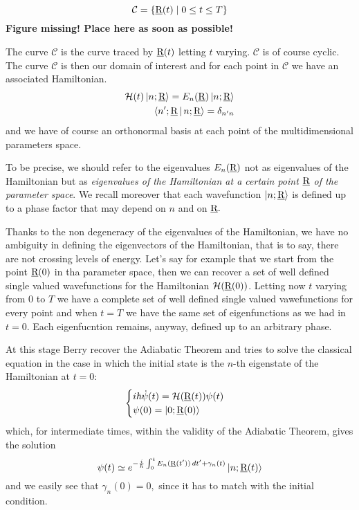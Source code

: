 \begin{equation}
\mathcal{C}=\left\{\underline{\textrm{R}}(t)\mid 0\leq t\leq T \right\}
\label{eq:Curve_C}
\end{equation}
\textbf{Figure missing! Place here as soon as possible!}

The curve $ \mathcal{C} $ is the curve traced by $ \underline{\textrm{R}}(t) $ letting $ t $ varying. $ \mathcal{C} $ is of course cyclic.
The curve $ \mathcal{C} $ is then our domain of interest and for each point in $ \mathcal{C} $ we have an associated Hamiltonian.
\begin{align}
\mathcal{H}(t)\Ket{n;\underline{\textrm{R}}}=E_n(\underline{\textrm{R}})\Ket{n;\underline{\textrm{R}}}\\
\Braket{n';\underline{\textrm{R}}|n;\underline{\textrm{R}}}=\delta_{n'n}
\end{align}
and we have of course an orthonormal basis at each point of the multidimensional parameters space.
\begin{rem}
	To be precise, we should refer to the eigenvalues $ E_{n}(\underline{\textrm{R}}) $ not as eigenvalues of the Hamiltonian but as \emph{eigenvalues of the Hamiltonian at a certain point $ \underline{\textrm{R}} $ of the parameter space}. We recall moreover that each wavefunction $ \Ket{n;\underline{\textrm{R}}} $ is defined up to a phase factor that may depend on $ n $ and on $ \underline{\textrm{R}}. $ 
\end{rem}
\begin{rem}
	Thanks to the non degeneracy of the eigenvalues of the Hamiltonian, we have no ambiguity in defining the eigenvectors of the Hamiltonian, that is to say, there are not crossing levels of energy. Let's say for example that we start from the point $ \underline{\textrm{R}}(0) $ in tha parameter space, then we can recover a set of well defined single valued wavefunctions for the Hamiltonian $ \mathcal{H}(\underline{\textrm{R}}(0)) $. Letting now $ t $ varying from $ 0 $ to $ T $ we have a complete set of well defined single valued vawefunctions for every point and when $ t=T $ we have the same set of eigenfunctions as we had in $ t=0. $ Each eigenfucntion remains, anyway, defined up to an arbitrary phase. 
\end{rem}

At this stage Berry recover the Adiabatic Theorem and tries to solve the classical \Sch equation in the case in which the initial state is the $ n $-th eigenstate of the Hamiltonian at $ t=0 $:
\begin{equation}
\begin{cases}
i\hbar\dot{\psi}(t)=\mathcal{H}(\underline{\textrm{R}}(t))\psi(t)\\
\psi(0)=\Ket{0;\underline{\textrm{R}}(0)}
\end{cases}
\end{equation}
which, for intermediate times, within the validity of the Adiabatic Theorem, gives the solution
\begin{equation}
\psi(t)\simeq e^{-\frac{i}{\hbar}\int_{0}^{t}E_n(\underline{\textrm{R}}(t'))\mathop{}\!d t'+\gamma_n(t)}\Ket{n;\underline{\textrm{R}}(t)}
\label{eq:gen_solution}
\end{equation}
and we easily see that $ \gamma_n(0)=0, $ since it has to match with the initial condition.

